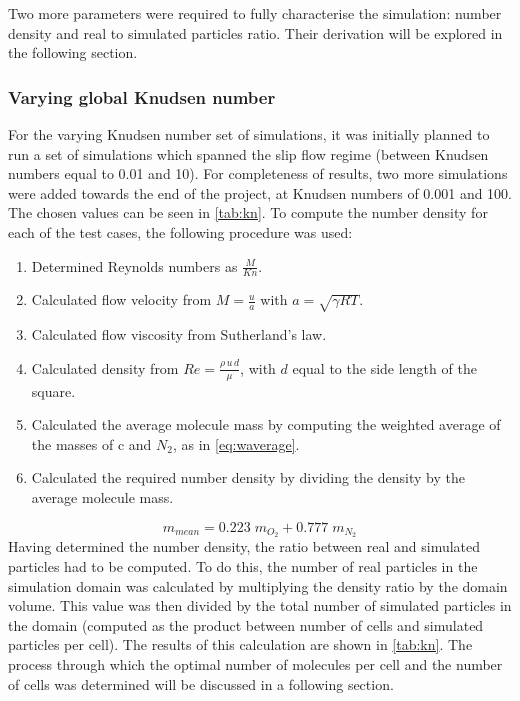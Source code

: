 Two more parameters were required to fully characterise the simulation: number density and real to simulated particles ratio. Their derivation will be explored in the following section.

\subsubsection{Varying global Knudsen number}
For the varying Knudsen number set of simulations, it was initially planned to run a set of simulations which spanned the slip flow regime (between Knudsen numbers equal to 0.01 and 10). For completeness of results, two more simulations were added towards the end of the project, at Knudsen numbers of 0.001 and 100.  The chosen values can be seen in \autoref{tab:kn}. 
To compute the number density for each of the test cases, the following procedure was used:
\begin{enumerate}
    \item Determined Reynolds numbers as $\frac{M}{Kn}$.
    \item Calculated flow velocity from $M = \frac{u}{a}$ with $a = \sqrt{\gamma R T}$.
    \item Calculated flow viscosity from Sutherland's law.
    \item Calculated density from $Re = \frac{\rho\, u\, d}{\mu}$, with $d$ equal to the side length of the square.
    \item Calculated the average molecule mass by computing the weighted average of the masses of c and $N_{2}$, as in \autoref{eq:waverage}.
    \item Calculated the required number density by dividing the density by the average molecule mass.
\end{enumerate}
\begin{equation}
    m_{mean} = 0.223\; m_{O_{2}} + 0.777\; m_{N_{2}}
    \label{eq:waverage}
\end{equation}
Having determined the number density, the ratio between real and simulated particles had to be computed. To do this, the number of real particles in the simulation domain was calculated by multiplying the density ratio by the domain volume. This value was then divided by the total number of simulated particles in the domain (computed as the product between number of cells and simulated particles per cell). The results of this calculation are shown in \autoref{tab:kn}. The process through which the optimal number of molecules per cell and the number of cells was determined will be discussed in a following section.

